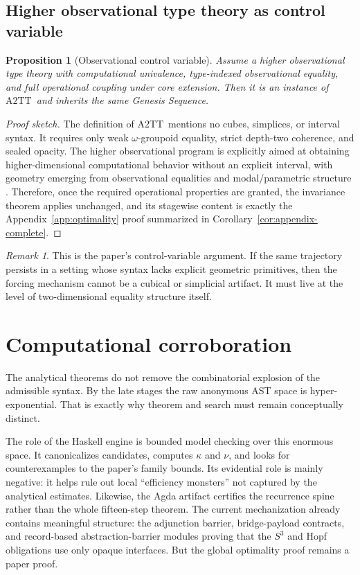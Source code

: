 \documentclass{lmcs}
\theoremstyle{plain}
\newtheorem{prop}[thm]{Proposition}
\theoremstyle{definition}
\theoremstyle{remark}
\newtheorem{rem}[thm]{Remark}
\newcommand{\ATwo}{\ensuremath{\mathrm{A2TT}}}
\begin{document}
\subsection{Higher observational type theory as control variable}

\begin{prop}[Observational control variable]
\label{prop:hobtt}
Assume a higher observational type theory with computational univalence, type-indexed observational equality, and full operational coupling under core extension.
Then it is an instance of \ATwo\ and inherits the same Genesis Sequence.
\end{prop}

\begin{proof}[Proof sketch]
The definition of \ATwo\ mentions no cubes, simplices, or interval syntax.
It requires only weak $\omega$-groupoid equality, strict depth-two coherence, and sealed opacity.
The higher observational program is explicitly aimed at obtaining higher-dimensional computational behavior without an explicit interval, with geometry emerging from observational equalities and modal/parametric structure \cite{towards-hobtt,internal-parametricity,observational-equality}.
Therefore, once the required operational properties are granted, the invariance theorem applies unchanged, and its stagewise content is exactly the Appendix~\ref{app:optimality} proof summarized in Corollary~\ref{cor:appendix-complete}.
\end{proof}

\begin{rem}
This is the paper's control-variable argument.
If the same trajectory persists in a setting whose syntax lacks explicit geometric primitives, then the forcing mechanism cannot be a cubical or simplicial artifact.
It must live at the level of two-dimensional equality structure itself.
\end{rem}

\section{Computational corroboration}
\label{sec:corroboration}

The analytical theorems do not remove the combinatorial explosion of the admissible syntax.
By the late stages the raw anonymous AST space is hyper-exponential.
That is exactly why theorem and search must remain conceptually distinct.

The role of the Haskell engine is bounded model checking over this enormous space.
It canonicalizes candidates, computes $\kappa$ and $\nu$, and looks for counterexamples to the paper's family bounds.
Its evidential role is mainly negative: it helps rule out local ``efficiency monsters'' not captured by the analytical estimates.
Likewise, the Agda artifact certifies the recurrence spine rather than the whole fifteen-step theorem.
The current mechanization already contains meaningful structure: the adjunction barrier, bridge-payload contracts, and record-based abstraction-barrier modules proving that the $S^3$ and Hopf obligations use only opaque interfaces.
But the global optimality proof remains a paper proof.
\end{document}
